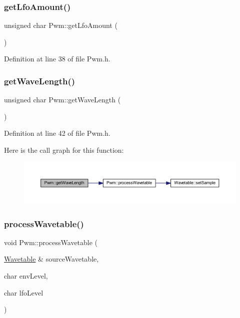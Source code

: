\subsubsection{\texorpdfstring{get\+Lfo\+Amount()}{getLfoAmount()}}
{\footnotesize\ttfamily unsigned char Pwm\+::get\+Lfo\+Amount (\begin{DoxyParamCaption}{ }\end{DoxyParamCaption})\hspace{0.3cm}{\ttfamily [inline]}}



Definition at line 38 of file Pwm.\+h.

\mbox{\label{class_pwm_a8d525e1a70c9a96c3a0ab4b0307da953}} 
\subsubsection{\texorpdfstring{get\+Wave\+Length()}{getWaveLength()}}
{\footnotesize\ttfamily unsigned char Pwm\+::get\+Wave\+Length (\begin{DoxyParamCaption}{ }\end{DoxyParamCaption})\hspace{0.3cm}{\ttfamily [inline]}}



Definition at line 42 of file Pwm.\+h.

Here is the call graph for this function\+:
\nopagebreak
\begin{figure}[H]
\begin{center}
\leavevmode
\includegraphics[width=350pt]{d6/df6/class_pwm_a8d525e1a70c9a96c3a0ab4b0307da953_cgraph}
\end{center}
\end{figure}
\mbox{\label{class_pwm_a51b2ea74a5b67115148141a843cddca1}} 
\subsubsection{\texorpdfstring{process\+Wavetable()}{processWavetable()}}
{\footnotesize\ttfamily void Pwm\+::process\+Wavetable (\begin{DoxyParamCaption}\item[{\hyperlink{class_wavetable}{Wavetable} \&}]{source\+Wavetable,  }\item[{char}]{env\+Level,  }\item[{char}]{lfo\+Level }\end{DoxyParamCaption})}



